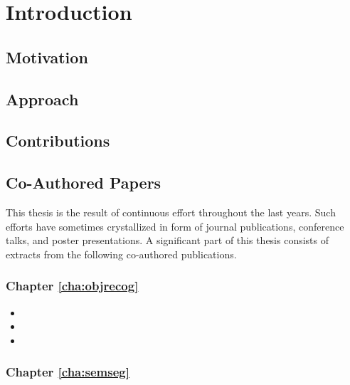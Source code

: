 \chapter{Introduction}
\label{cha:introduction}

\lipsum[10]
\lipsum[10]
\lipsum[10]
\lipsum[10]
\lipsum[10]
\lipsum[10]
\lipsum[10]
\lipsum[10]
\lipsum[10]
\lipsum[10]

\section{Motivation}
\label{cha:introduction:sec:motivation}

\section{Approach}
\label{cha:introduction:sec:approach}

\section{Contributions}
\label{cha:introduction:sec:contributions}

\section{Co-Authored Papers}
\label{cha:introduction:sec:papers}

This thesis is the result of continuous effort throughout the last years. Such efforts have sometimes crystallized in form of journal publications, conference talks, and poster presentations. A significant part of this thesis consists of extracts from the following co-authored publications.

\subsection{Chapter \ref{cha:objrecog}}

\begin{itemize}
  \item {}
  \item {}
  \item {}
\end{itemize}

\subsection{Chapter \ref{cha:semseg}}

